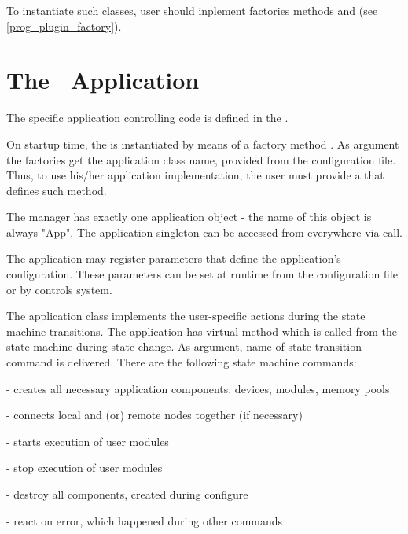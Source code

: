 To instantiate such classes, user should inplement factories methods 
 and  (see \ref{prog_plugin_factory}).


\section[The DABC application]{The \dabc\ Application}
\label{prog_plugin_applicaton}
The specific application controlling code is defined in the .

On startup time, the  is instantiated
by means of a factory method .
As argument the factories get the application class name, 
provided from the configuration file.
Thus, to use his/her application implementation, 
the user must provide a  that defines such method.

The manager has exactly one application object - the name of this object is always "App".
The application singleton can be accessed from everywhere 
via  call. 

The application  may register parameters that 
define the application's configuration. These parameters can be set at 
runtime from the configuration file or by controls system.

The application class implements the user-specific actions during
the state machine transitions. The application has virtual method 
 which is called from the state machine during state change.
As argument, name of state transition command is delivered. 
There are the following state machine commands:

\bdes
\item[\keyw{dabc::Manager::stcmdDoConfigure}] - creates all necessary application components: devices, modules, memory pools
\item[\keyw{dabc::Manager::stcmdDoEnable}] - connects local and (or) remote nodes together (if necessary) 
\item[\keyw{dabc::Manager::stcmdDoStart}] - starts execution of user modules 
\item[\keyw{dabc::Manager::stcmdDoStop}] - stop execution of user modules
\item[\keyw{dabc::Manager::stcmdDoHalt}] - destroy all components, created during configure
\item[\keyw{dabc::Manager::stcmdDoError}] - react on error, which happened during other commands
\edes
  

